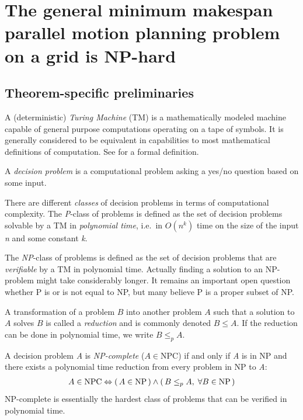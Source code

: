 \section{The general minimum makespan parallel motion planning problem on a grid is NP-hard}\label{chapter:main_proof}

\subsection{Theorem-specific preliminaries}

A (deterministic) \emph{Turing Machine} (TM) is a mathematically modeled machine capable of general purpose computations operating on a tape of symbols. 
It is generally considered to be equivalent in capabilities to most mathematical definitions of computation. 
See \cite{aw/HopcroftU79} for a formal definition.

A \emph{decision problem} is a computational problem asking a yes/no question based on some input.

There are different \emph{classes} of decision problems in terms of computational complexity. 
The \emph{P}-class of problems is defined as the set of decision problems solvable by a TM in \emph{polynomial time}, i.e.~in \(O(n^k)\) time on the size of the input \emph{n} and some constant \emph{k}.

The \emph{NP}-class of problems is defined as the set of decision problems that are \emph{verifiable} by a TM in polynomial time. 
Actually finding a solution to an NP-problem might take considerably longer. 
It remains an important open question whether P is or is not equal to NP, but many believe P is a proper subset of NP.

A transformation of a problem \(B\) into another problem \(A\) such that a solution to \(A\) solves \(B\) is called a \emph{reduction} and is commonly denoted \(B \leq A\). 
If the reduction can be done in polynomial time, we write \(B \leq_p A\).

\begin{definition}\label{def:np_complete}
	A decision problem \emph{A} is \emph{NP-complete} (\(A \in \text{NPC}\)) if and only if \emph{A} is in NP and there exists a polynomial time reduction from every problem in NP to \emph{A}:
	\begin{align*}
		A \in \text{NPC} \Leftrightarrow (\, A \in \text{NP} \,) \land (\, B \leq_p A, \; \forall B \in \text{NP} \,)
	\end{align*}
	NP-complete is essentially the hardest class of problems that can be verified in polynomial time. 
\end{definition}

